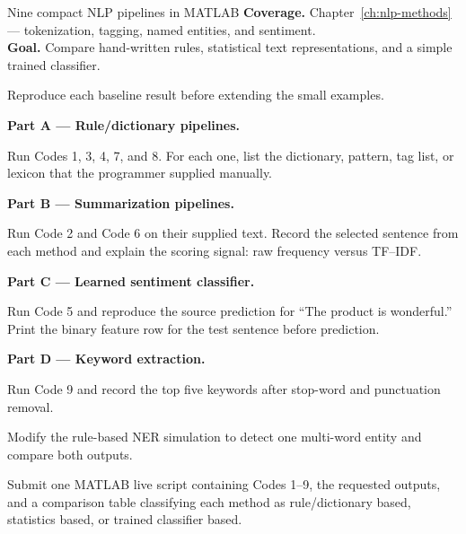 
\begin{labproject}{Nine compact NLP pipelines in MATLAB}
\textbf{Coverage.} Chapter~\ref{ch:nlp-methods} --- tokenization, tagging, named entities, and sentiment.\\
\textbf{Goal.} Compare hand-written rules, statistical text representations, and a simple trained classifier.

\begin{labmode}
Reproduce each baseline result before extending the small examples.
\end{labmode}

\medskip\noindent\textbf{Part A --- Rule/dictionary pipelines.}\par
Run Codes 1, 3, 4, 7, and 8. For each one, list the dictionary, pattern, tag list, or lexicon that the programmer supplied manually.

\medskip\noindent\textbf{Part B --- Summarization pipelines.}\par
Run Code 2 and Code 6 on their supplied text. Record the selected sentence from each method and explain the scoring signal: raw frequency versus TF--IDF.

\medskip\noindent\textbf{Part C --- Learned sentiment classifier.}\par
Run Code 5 and reproduce the source prediction for ``The product is wonderful.'' Print the binary feature row for the test sentence before prediction.

\medskip\noindent\textbf{Part D --- Keyword extraction.}\par
Run Code 9 and record the top five keywords after stop-word and punctuation removal.

\begin{tryit}
Modify the rule-based NER simulation to detect one multi-word entity and compare both outputs.
\end{tryit}
\end{labproject}

\begin{labdeliverable}
Submit one MATLAB live script containing Codes 1--9, the requested outputs, and a comparison table classifying each method as rule/dictionary based, statistics based, or trained classifier based.
\end{labdeliverable}
